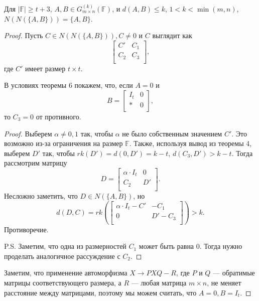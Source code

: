 \documentclass{article}
\begin{document}
\begin{theorem}
    Для $|\mathbb{F}| \ge t + 3$, $A, B \in G_{m \times n}^{(k)}(\mathbb{F})$, и $d(A, B) \le k$, $1 < k < \min(m,n)$,  
    $N(N(\{A, B\})) = \{A, B\}$.
\end{theorem}
\begin{proof}
Пусть $C \in N(N(\{A, B\})), C \ne 0$ и $C$ выглядит как \[
\left[
\begin{array}{c|c}
C' & C_1 \\ 
\hline 
C_2 & C_3 \\
\end{array}
\right],
\]
где $C'$ имеет размер $t \times t$.
\begin{lemma}
    
В условиях теоремы 6 покажем, что, если $A = 0$ и \[ B = 
\left[
\begin{array}{c|c}
I_t & 0 \\ 
\hline 
* & 0 \\
\end{array}
\right],
\] то $C_3 = 0$ от противного.
\end{lemma}
\begin{proof}
    
Выберем $\alpha \ne 0, 1$ так, чтобы $\alpha$ не было собственным значением $C'$. Это возможно из-за ограничения на размер $\mathbb{F}$. Также, используя вывод из теоремы 4, выберем $D'$ так, чтобы $rk(D') = d(0, D') = k - t$, $d(C_3, D') > k - t$. Тогда рассмотрим матрицу 
\[D = 
\left[
\begin{array}{c|c}
\alpha \cdot I_t & 0 \\ 
\hline 
C_2 & D' \\
\end{array}
\right].
\]
 Несложно заметить, что $D \in N(\{A, B\})$, но 
\[d(D, C) = rk
\left(
\left[
\begin{array}{c|c}
\alpha \cdot I_t - C' & -C_1 \\ 
\hline 
0 & D' - C_3 \\
\end{array}
\right]
\right) > k.
\]
Противоречие.

P.S. Заметим, что одна из размерностей $C_1$ может быть равна 0. Тогда нужно проделать аналогичное рассуждение с $C_2$.
\end{proof}
Заметим, что применение автоморфизма $X \rightarrow PXQ - R$, где $P$ и $Q$ — обратимые матрицы соответствующего размера, а $R$ — любая матрица $m \times n$, не меняет расстояние между матрицами, поэтому мы можем считать, что $A = 0, B = I_t$.


\end{proof}
\end{document}
